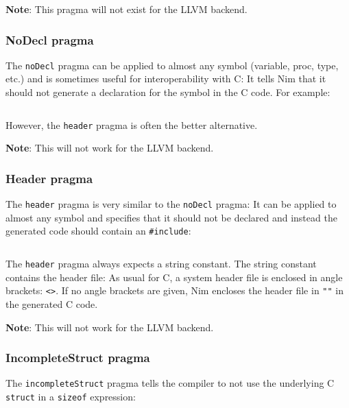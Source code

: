 \textbf{Note}: This pragma will not exist for the LLVM backend.

\hypertarget{nodecl-pragma}{%
\subsubsection{NoDecl pragma}\label{nodecl-pragma}}

The \texttt{noDecl} pragma can be applied to almost any symbol
(variable, proc, type, etc.) and is sometimes useful for
interoperability with C: It tells Nim that it should not generate a
declaration for the symbol in the C code. For example:

\begin{verbatim}
\end{verbatim}

However, the \texttt{header} pragma is often the better alternative.

\textbf{Note}: This will not work for the LLVM backend.

\hypertarget{header-pragma}{%
\subsubsection{Header pragma}\label{header-pragma}}

The \texttt{header} pragma is very similar to the \texttt{noDecl}
pragma: It can be applied to almost any symbol and specifies that it
should not be declared and instead the generated code should contain an
\texttt{\#include}:

\begin{verbatim}
\end{verbatim}

The \texttt{header} pragma always expects a string constant. The string
constant contains the header file: As usual for C, a system header file
is enclosed in angle brackets: \texttt{\textless{}\textgreater{}}. If no
angle brackets are given, Nim encloses the header file in \texttt{""} in
the generated C code.

\textbf{Note}: This will not work for the LLVM backend.

\hypertarget{incompletestruct-pragma}{%
\subsubsection{IncompleteStruct pragma}\label{incompletestruct-pragma}}

The \texttt{incompleteStruct} pragma tells the compiler to not use the
underlying C \texttt{struct} in a \texttt{sizeof} expression:

